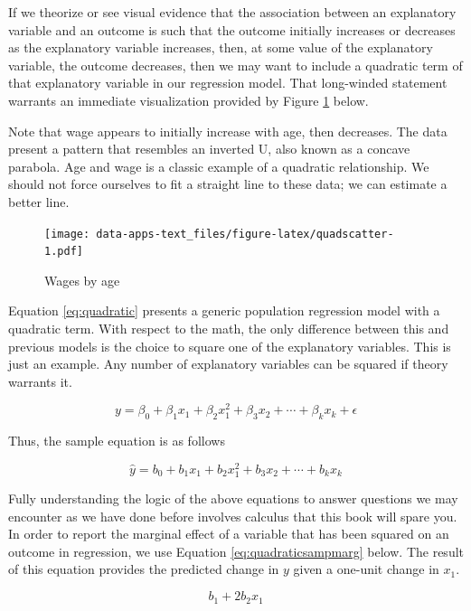 \documentclass[
]{book}
\begin{document}
If we theorize or see visual evidence that the association between an explanatory variable and an outcome is such that the outcome initially increases or decreases as the explanatory variable increases, then, at some value of the explanatory variable, the outcome decreases, then we may want to include a quadratic term of that explanatory variable in our regression model. That long-winded statement warrants an immediate visualization provided by Figure \ref{fig:quadscatter} below.

Note that wage appears to initially increase with age, then decreases. The data present a pattern that resembles an inverted U, also known as a concave parabola. Age and wage is a classic example of a quadratic relationship. We should not force ourselves to fit a straight line to these data; we can estimate a better line.

\begin{figure}
\centering
\texttt{[image: data-apps-text\_files/figure-latex/quadscatter-1.pdf]}
\caption{\label{fig:quadscatter}Wages by age}
\end{figure}

Equation \eqref{eq:quadratic} presents a generic population regression model with a quadratic term. With respect to the math, the only difference between this and previous models is the choice to square one of the explanatory variables. This is just an example. Any number of explanatory variables can be squared if theory warrants it.

\begin{equation}
y = \beta_0 + \beta_1x_1 + \beta_2x_1^2 + \beta_3x_2 + \cdots + \beta_kx_k + \epsilon
\label{eq:quadratic}
\end{equation}

Thus, the sample equation is as follows

\begin{equation}
\hat{y} = b_0 + b_1x_1 + b_2x_1^2 + b_3x_2 + \cdots + b_kx_k
\label{eq:quadraticsamp}
\end{equation}

Fully understanding the logic of the above equations to answer questions we may encounter as we have done before involves calculus that this book will spare you. In order to report the marginal effect of a variable that has been squared on an outcome in regression, we use Equation \eqref{eq:quadraticsampmarg} below. The result of this equation provides the predicted change in \(y\) given a one-unit change in \(x_1\).

\begin{equation}
b_1 + 2b_2x_1
\label{eq:quadraticsampmarg}
\end{equation}
\end{document}
